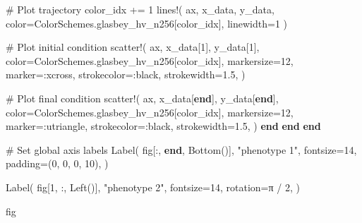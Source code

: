 \documentclass[
]{scrartcl}
\newenvironment{Shaded}{\begin{snugshade}}{\end{snugshade}}
\newcommand{\CommentTok}[1]{\textcolor[rgb]{0.37,0.37,0.37}{#1}}
\newcommand{\ConstantTok}[1]{\textcolor[rgb]{0.56,0.35,0.01}{#1}}
\newcommand{\ControlFlowTok}[1]{\textcolor[rgb]{0.00,0.23,0.31}{\textbf{#1}}}
\newcommand{\FloatTok}[1]{\textcolor[rgb]{0.68,0.00,0.00}{#1}}
\newcommand{\FunctionTok}[1]{\textcolor[rgb]{0.28,0.35,0.67}{#1}}
\newcommand{\KeywordTok}[1]{\textcolor[rgb]{0.00,0.23,0.31}{\textbf{#1}}}
\newcommand{\NormalTok}[1]{\textcolor[rgb]{0.00,0.23,0.31}{#1}}
\newcommand{\OperatorTok}[1]{\textcolor[rgb]{0.37,0.37,0.37}{#1}}
\newcommand{\StringTok}[1]{\textcolor[rgb]{0.13,0.47,0.30}{#1}}
\begin{document}
\begin{Shaded}
\begin{Highlighting}[]
            \CommentTok{\# Plot trajectory}
\NormalTok{            color\_idx }\OperatorTok{+=} \FloatTok{1}
            \FunctionTok{lines!}\NormalTok{(}
\NormalTok{                ax,}
\NormalTok{                x\_data,}
\NormalTok{                y\_data,}
\NormalTok{                color}\OperatorTok{=}\NormalTok{ColorSchemes.glasbey\_hv\_n256[color\_idx],}
\NormalTok{                linewidth}\OperatorTok{=}\FloatTok{1}
\NormalTok{            )}

            \CommentTok{\# Plot initial condition}
            \FunctionTok{scatter!}\NormalTok{(}
\NormalTok{                ax,}
\NormalTok{                x\_data[}\FloatTok{1}\NormalTok{],}
\NormalTok{                y\_data[}\FloatTok{1}\NormalTok{],}
\NormalTok{                color}\OperatorTok{=}\NormalTok{ColorSchemes.glasbey\_hv\_n256[color\_idx],}
\NormalTok{                markersize}\OperatorTok{=}\FloatTok{12}\NormalTok{,}
\NormalTok{                marker}\OperatorTok{=:}\NormalTok{xcross,}
\NormalTok{                strokecolor}\OperatorTok{=:}\NormalTok{black,}
\NormalTok{                strokewidth}\OperatorTok{=}\FloatTok{1.5}\NormalTok{,}
\NormalTok{            )}

            \CommentTok{\# Plot final condition}
            \FunctionTok{scatter!}\NormalTok{(}
\NormalTok{                ax,}
\NormalTok{                x\_data[}\KeywordTok{end}\NormalTok{],}
\NormalTok{                y\_data[}\KeywordTok{end}\NormalTok{],}
\NormalTok{                color}\OperatorTok{=}\NormalTok{ColorSchemes.glasbey\_hv\_n256[color\_idx],}
\NormalTok{                markersize}\OperatorTok{=}\FloatTok{12}\NormalTok{,}
\NormalTok{                marker}\OperatorTok{=:}\NormalTok{utriangle,}
\NormalTok{                strokecolor}\OperatorTok{=:}\NormalTok{black,}
\NormalTok{                strokewidth}\OperatorTok{=}\FloatTok{1.5}\NormalTok{,}
\NormalTok{            )}
        \ControlFlowTok{end}
    \ControlFlowTok{end}
\ControlFlowTok{end}

\CommentTok{\# Set global axis labels}
\FunctionTok{Label}\NormalTok{(}
\NormalTok{    fig[}\OperatorTok{:}\NormalTok{, }\KeywordTok{end}\NormalTok{, }\FunctionTok{Bottom}\NormalTok{()],}
    \StringTok{"phenotype 1"}\NormalTok{,}
\NormalTok{    fontsize}\OperatorTok{=}\FloatTok{14}\NormalTok{,}
\NormalTok{    padding}\OperatorTok{=}\NormalTok{(}\FloatTok{0}\NormalTok{, }\FloatTok{0}\NormalTok{, }\FloatTok{0}\NormalTok{, }\FloatTok{10}\NormalTok{),}
\NormalTok{)}

\FunctionTok{Label}\NormalTok{(}
\NormalTok{    fig[}\FloatTok{1}\NormalTok{, }\OperatorTok{:}\NormalTok{, }\FunctionTok{Left}\NormalTok{()],}
    \StringTok{"phenotype 2"}\NormalTok{,}
\NormalTok{    fontsize}\OperatorTok{=}\FloatTok{14}\NormalTok{,}
\NormalTok{    rotation}\OperatorTok{=}\ConstantTok{π} \OperatorTok{/} \FloatTok{2}\NormalTok{,}
\NormalTok{)}

\NormalTok{fig}
\end{Highlighting}
\end{Shaded}
\end{document}
